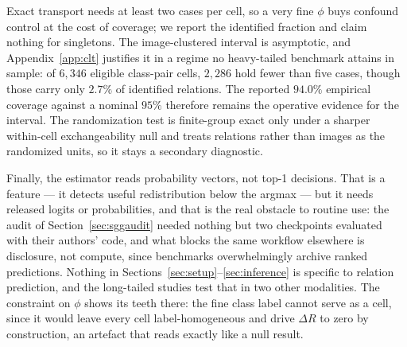 Exact transport needs at least two cases per cell, so a very fine $\phi$ buys confound
control at the cost of coverage; we report the identified fraction and claim nothing for
singletons. The image-clustered interval is asymptotic, and Appendix~\ref{app:clt}
justifies it in a regime no heavy-tailed benchmark attains in sample: of $6{,}346$ eligible
class-pair cells, $2{,}286$ hold fewer than five cases, though those carry only $2.7\%$ of
identified relations. The reported $94.0\%$ empirical coverage against a nominal $95\%$
therefore remains the operative evidence for the interval. The randomization test is
finite-group exact only under a sharper within-cell exchangeability null and treats relations
rather than images as the randomized units, so it stays a secondary diagnostic.

Finally, the estimator reads probability vectors, not top-1 decisions. That is a feature
--- it detects useful redistribution below the argmax --- but it needs released logits or
probabilities, and that is the real obstacle to routine use: the audit of
Section~\ref{sec:sggaudit} needed nothing but two checkpoints evaluated with their
authors' code, and what blocks the same workflow elsewhere is disclosure, not compute,
since benchmarks overwhelmingly archive ranked predictions. Nothing in
Sections~\ref{sec:setup}--\ref{sec:inference} is specific to relation prediction, and the
long-tailed studies test that in two other modalities. The constraint on $\phi$ shows its
teeth there: the fine class label cannot serve as a cell, since it would leave every cell
label-homogeneous and drive $\Delta R$ to zero by construction, an artefact that reads
exactly like a null result.
